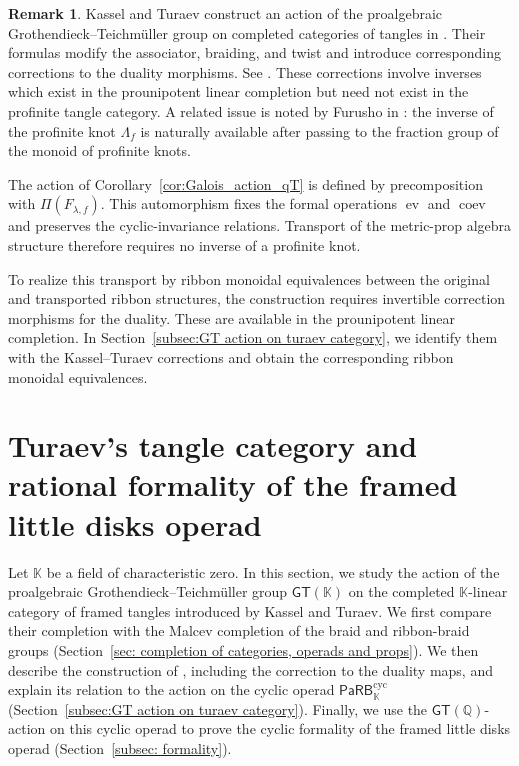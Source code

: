 \documentclass{amsart}
\newcommand{\kk}{\mathbb{K}}    %
\newcommand{\PaRB}{\mathsf{PaRB}}
\newcommand{\ev}{\operatorname{ev}}
\newcommand{\coev}{\operatorname{coev}}
\newcommand{\gt}{\mathsf{GT}}
\theoremstyle{definition}
\newtheorem{remark}[theorem]{Remark}%
\numberwithin{equation}{section}
\begin{document}
\begin{remark}
\label{remark: comparison with Kassel Turaev}
Kassel and Turaev construct an action of the proalgebraic
Grothendieck--Teichmüller group on completed categories of tangles in
\cite[Appendix~D]{KT_Tangles}. Their formulas modify the associator,
braiding, and twist and introduce corresponding corrections to the
duality morphisms. See
\cite[Equations~\textnormal{(D.2)}--\textnormal{(D.7)}]{KT_Tangles}. These corrections involve inverses which exist in the prounipotent linear completion but need not exist in the profinite tangle category. A related issue is noted by Furusho in
\cite[Remark~2.43]{furusho_galois_2017}: the inverse of the
profinite knot $\Lambda_f$ is naturally available after passing
to the fraction group of the monoid of profinite knots.

The action of Corollary~\ref{cor:Galois_action_qT} is defined by
precomposition with $\Pi(F_{\lambda,f})$. This automorphism fixes
the formal operations $\ev$ and $\coev$ and preserves the
cyclic-invariance relations. Transport of the metric-prop algebra
structure therefore requires no inverse of a profinite knot.

To realize this transport by ribbon monoidal equivalences between
the original and transported ribbon structures, the construction
requires invertible correction morphisms for the duality.
These are available in the prounipotent linear completion.
In Section~\ref{subsec:GT action on turaev category}, we identify
them with the Kassel--Turaev corrections and obtain the
corresponding ribbon monoidal equivalences.
\end{remark}


\section{Turaev's tangle category and rational formality of the
framed little disks operad}
\label{sec: Turaev's tangle category and rational formality of the little disks operad}

Let $\kk$ be a field of characteristic zero. In this section, we
study the action of the proalgebraic Grothendieck--Teichmüller group
$\gt(\kk)$ on the completed $\kk$-linear category of framed tangles
introduced by Kassel and Turaev. We first compare their completion
with the Malcev completion of the braid and ribbon-braid groups
(Section~\ref{sec: completion of categories, operads and props}).
We then describe the construction of
\cite[Appendix~D]{KT_Tangles}, including the correction to the
duality maps, and explain its relation to the action on the cyclic
operad $\PaRB_{\kk}^{\mathrm{cyc}}$
(Section~\ref{subsec:GT action on turaev category}).
Finally, we use the $\gt(\mathbb{Q})$-action on this cyclic operad
to prove the cyclic formality of the framed little disks operad
(Section~\ref{subsec: formality}).
\end{document}
